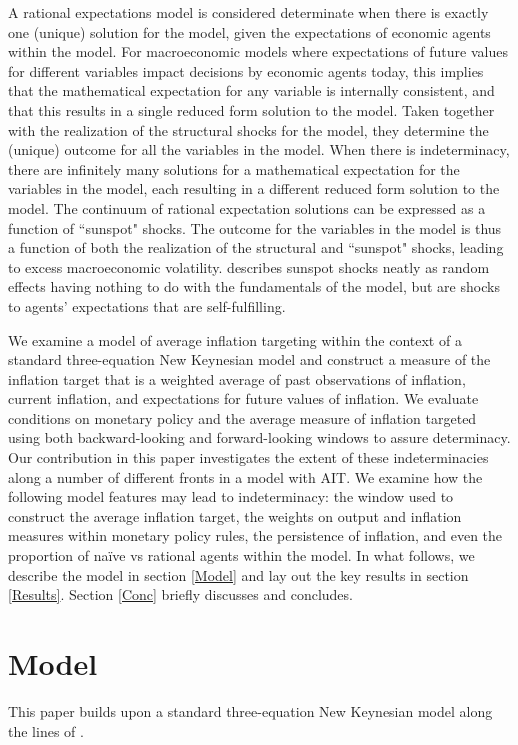 \documentclass[english,authoryear,12pt]{elsarticle}
\begin{document}
A rational expectations model is considered determinate when there is exactly one (unique) solution for the model, given the expectations of economic agents within the model. For macroeconomic models where expectations of future values for different variables impact decisions by economic agents today, this implies that the mathematical expectation for any variable is internally consistent, and that this results in a single reduced form solution to the model. Taken together with the realization of the structural shocks for the model, they determine the (unique) outcome for all the variables in the model. When there is indeterminacy, there are infinitely many solutions for a mathematical expectation for the variables in the model, each resulting in a different reduced form solution to the model. The continuum of rational expectation solutions can be expressed as a function of ``sunspot" shocks. The outcome for the variables in the model is thus a function of both the realization of the structural and ``sunspot" shocks, leading to excess macroeconomic volatility. \cite{woodford1987} describes sunspot shocks neatly as random effects having nothing to do with the fundamentals of the model, but are shocks to agents' expectations that are self-fulfilling. 

We examine a model of average inflation targeting within the context of a standard three-equation New Keynesian model and construct a measure of the inflation target that is a weighted average of past observations of inflation, current inflation, and expectations for future values of inflation. We evaluate conditions on monetary policy and the average measure of inflation targeted using both backward-looking and forward-looking windows to assure determinacy. Our contribution in this paper investigates the extent of these indeterminacies along a number of different fronts in a model with AIT. We examine how the following model features may lead to indeterminacy: the window used to construct the average inflation target, the weights on output and inflation measures within monetary policy rules, the persistence of inflation, and even the proportion of na\"ive vs rational agents within the model. In what follows, we describe the model in section \ref*{Model} and lay out the key results in section \ref*{Results}. Section \ref*{Conc} briefly discusses and concludes.

\section{\label{Model}Model}
This paper builds upon a standard three-equation New Keynesian model along the lines of \cite{clarida1999}.
\end{document}
